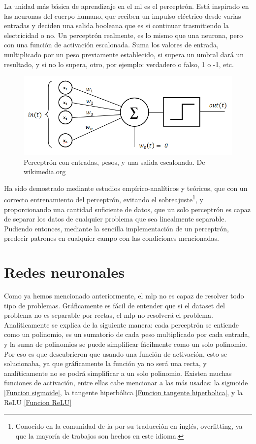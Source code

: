 La unidad más básica de aprendizaje en el \gls{ml} es el perceptrón. Está inspirado en las neuronas del cuerpo humano, que reciben un impulso eléctrico desde varias entradas y deciden una salida booleana que es si continuar trasmitiendo la electricidad o no. 
Un perceptrón realmente, es lo mismo que una neurona, pero con una función de activación escalonada. Suma los valores de entrada, multiplicado por un peso previamente establecido, si supera un umbral dará un resultado, y si no lo supera, otro, por ejemplo: verdadero o falso, 1 o -1, etc.

\begin{figure}[h]
	\centering
	\includegraphics[width=15cm]{archivos/imagenes/perceptron.png}
	\caption{Perceptrón con entradas, pesos, y una salida escalonada. De wikimedia.org}
\end{figure}

Ha sido demostrado mediante estudios empírico-analíticos y teóricos, que con un correcto entrenamiento del perceptrón, evitando el sobreajuste\footnote{Conocido en la comunidad de \gls{ia} por su traducción en inglés, overfitting, ya que la mayoría de trabajos son hechos en este idioma.}, y proporcionando una cantidad suficiente de datos, que un solo perceptrón es capaz de separar los datos de cualquier problema que sea linealmente separable. Pudiendo entonces, mediante la sencilla implementación de un perceptrón, predecir patrones en cualquier campo con las condiciones mencionadas.

\section{Redes neuronales}
\label{Redes Neuronales}
Como ya hemos mencionado anteriormente, el \gls{mlp} no es capaz de resolver todo tipo de problemas. Gráficamente es fácil de entender que si el dataset del problema no es separable por rectas, el \gls{mlp} no resolverá el problema. Analíticamente se explica de la siguiente manera: cada perceptrón se entiende como un polinomio, es un sumatorio de cada peso multiplicado por cada entrada, y la suma de polinomios se puede simplificar fácilmente como un solo polinomio. Por eso es que descubrieron que usando una función de activación, esto se solucionaba, ya que gráficamente la función ya no será una recta, y analíticamente no se podrá simplificar a un solo polinomio.
Existen muchas funciones de activación, entre ellas cabe mencionar a las más usadas: la sigmoide \ref{Funcion sigmoide}, la tangente hiperbólica \ref{Funcion tangente hiperbolica}, y la ReLU \ref{Funcion ReLU}

